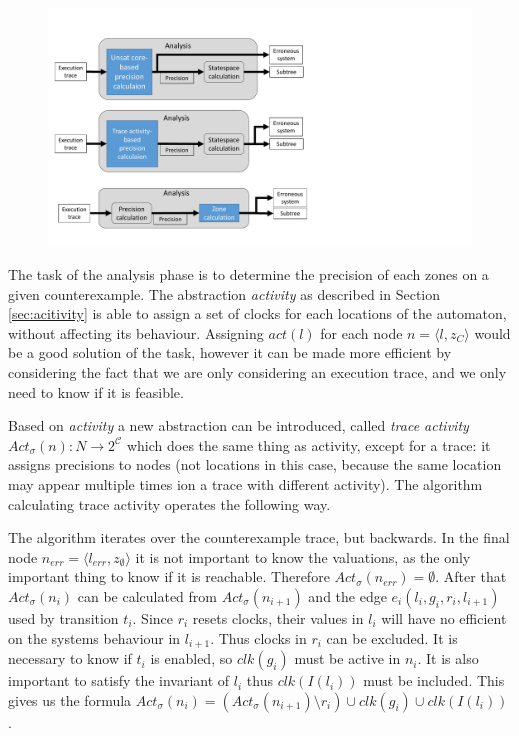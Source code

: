 \begin{figure}[h]
	\centering
	\includegraphics[width=\textwidth]{include/figures/modules_ssp_anal_act}
\end{figure}

The task of the analysis phase is to determine the precision of each zones on a given counterexample. The abstraction \emph{activity} as described in Section \ref{sec:acitivity} is able to assign a set of clocks for each locations of the automaton, without affecting its behaviour. Assigning $act(l)$ for each node $n=\langle l, z_{C} \rangle$ would be a good solution of the task, however it can be made more efficient by considering the fact that we are only considering an execution trace, and we only need to know if it is feasible.

Based on \emph{activity} a new abstraction can be introduced, called \emph{trace activity} $Act_\sigma(n): N \to 2^\mathcal{C}$ which does the same thing as activity, except for a trace: it assigns precisions to nodes (not locations in this case, because the same location may appear multiple times ion a trace with different activity). The algorithm calculating trace activity operates the following way.

The algorithm iterates over the counterexample trace, but backwards. In the final node  $n_{err}=\langle l_{err}, z_{\emptyset} \rangle$ it is not important to know the valuations, as the only important thing to know if it is reachable. Therefore $Act_\sigma(n_{err})=\emptyset$. After that $Act_\sigma(n_i)$ can be calculated from $Act_\sigma(n_{i+1})$ and the edge $e_i(l_i,g_i,r_i,l_{i+1})$ used by transition $t_i$. Since $r_i$ resets clocks, their values in $l_i$ will have no efficient on the systems behaviour in $l_{i+1}$. Thus clocks in $r_i$ can be excluded. It is necessary to know if $t_i$ is enabled, so $\textit{clk}(g_i)$ must be active in $n_i$. It is also important to satisfy the invariant of $l_i$ thus $\textit{clk}(I(l_i))$ must be included. This gives us the formula $Act_\sigma(n_i)=(Act_\sigma(n_{i+1}) \setminus r_i) \cup \textit{clk}(g_i) \cup \textit{clk}(I(l_i))$. 


